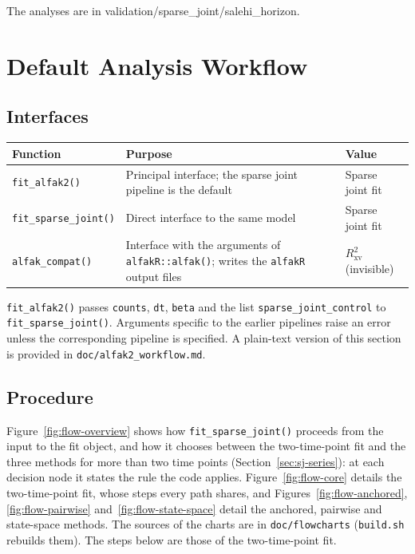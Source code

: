 \documentclass[11pt]{article}
\begin{document}
The analyses are in validation/sparse\_joint/salehi\_horizon.

\section{Default Analysis Workflow}
\label{sec:workflow}

\subsection{Interfaces}

\begin{center}
\begin{tabular}{L{0.22\textwidth}L{0.44\textwidth}L{0.24\textwidth}}
\toprule
Function & Purpose & Value \\
\midrule
\texttt{fit\_alfak2()} & Principal interface; the sparse joint pipeline is
the default & Sparse joint fit \\
\texttt{fit\_sparse\_joint()} & Direct interface to the same model & Sparse
joint fit \\
\texttt{alfak\_compat()} & Interface with the arguments of
\texttt{alfakR::alfak()}; writes the \texttt{alfakR} output files &
$R^2_{\mathrm{xv}}$ (invisible) \\
\bottomrule
\end{tabular}
\end{center}

\texttt{fit\_alfak2()} passes \texttt{counts}, \texttt{dt}, \texttt{beta} and
the list \texttt{sparse\_joint\_control} to \texttt{fit\_sparse\_joint()}.
Arguments specific to the earlier pipelines raise an error unless the
corresponding pipeline is specified. A plain-text version of this section is
provided in \texttt{doc/alfak2\_workflow.md}.

\subsection{Procedure}
\label{sec:procedure}

Figure~\ref{fig:flow-overview} shows how \texttt{fit\_sparse\_joint()}
proceeds from the input to the fit object, and how it chooses between the
two-time-point fit and the three methods for more than two time points
(Section~\ref{sec:sj-series}): at each decision node it states the rule the
code applies. Figure~\ref{fig:flow-core} details the two-time-point fit, whose
steps every path shares, and Figures~\ref{fig:flow-anchored},
\ref{fig:flow-pairwise} and~\ref{fig:flow-state-space} detail the anchored,
pairwise and state-space methods. The sources of the charts are in
\texttt{doc/flowcharts} (\texttt{build.sh} rebuilds them). The steps below are
those of the two-time-point fit.
\end{document}

